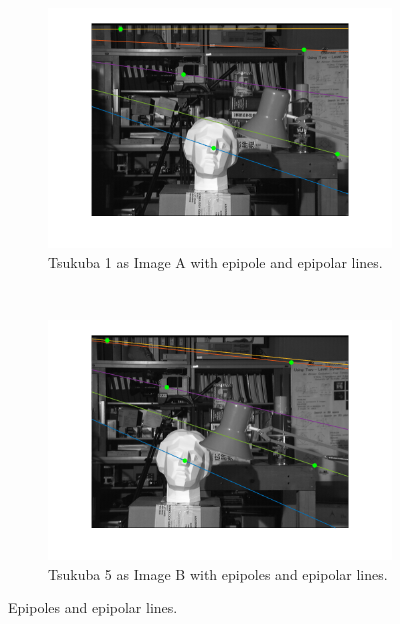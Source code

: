 \documentclass[a4paper, 10pt, conference]{ieeeconf}
\begin{document}
\begin{figure}[!ht]
  \captionsetup[subfigure]{position=b}
  \centering
    \begin{subfigure}{0.45\linewidth}
      \includegraphics[width=\textwidth]{pic/q1_3_d_A}
      \caption{Tsukuba 1 as Image A  with epipole and epipolar lines.}
      \label{fig:tsuka}
    \end{subfigure}
    ~
    \begin{subfigure}{0.45\linewidth}
      \includegraphics[width=\textwidth]{pic/q1_3_d_B}
      \caption{Tsukuba 5 as Image B with epipoles and epipolar lines.}
      \label{fig:tsukb}
    \end{subfigure}

	\caption{Epipoles and epipolar lines.}
  \label{fig:epipolar}
\end{figure}
\end{document}
